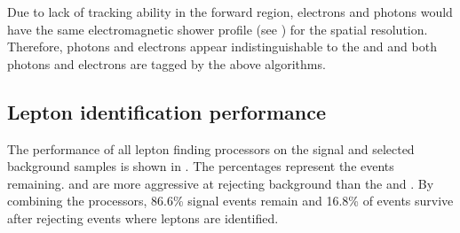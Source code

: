 Due to lack of tracking ability in the forward region, electrons and photons would have the same electromagnetic shower profile (see ) for the \ECAL spatial resolution. Therefore, photons and electrons appear indistinguishable to the \BeamCAL and \LumiCAL and both photons and electrons are tagged by the above algorithms.







\subsection{Lepton identification performance}

The performance of all lepton finding processors on the signal and selected background samples is shown in . The percentages represent the events remaining. \BonoLeptonFinder and \BonoTauFinder are more aggressive at rejecting background than the \IsolatedLeptonFinderProcessor and \TauFinderProcessor. By combining the processors, 86.6\% signal events remain and 16.8\% of \HepProcess{\Pep \Pem \to \Pquark\Pquark\Pquark\Pquark\Plepton\Pnu} events survive after rejecting events where leptons are identified.


